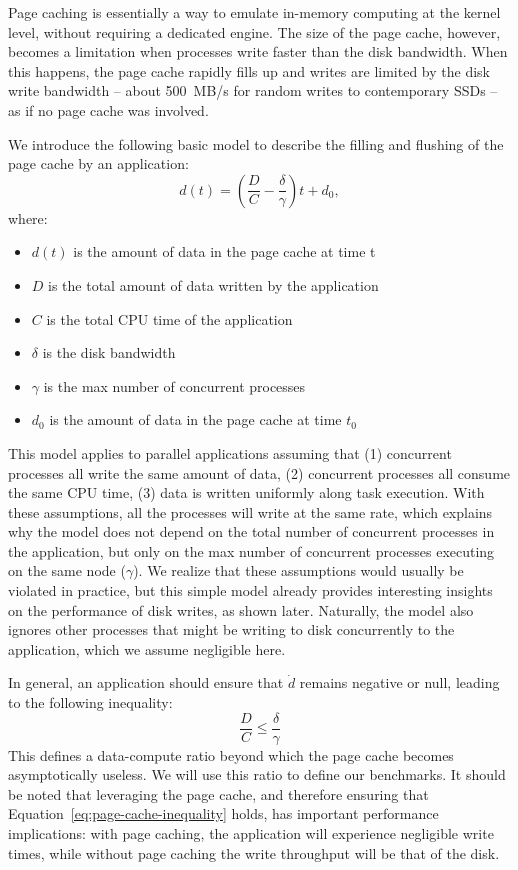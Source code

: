 \documentclass{IEEEtran}
\begin{document}
Page caching is essentially a way to 
emulate in-memory computing at the kernel level, without requiring a 
dedicated engine. The size of the page cache, however, becomes a 
limitation when processes write faster than the disk bandwidth. When 
this happens, the page cache rapidly fills up and writes are limited by 
the disk write bandwidth -- about 500~MB/s for random writes to 
contemporary SSDs  -- as if no page cache was involved.

We introduce the following basic model to describe the filling and 
flushing of the page cache by an application:
$$
d(t) = \left( \frac{D}{C} - \frac{\delta}{\gamma} \right)t + d_0,
$$
where:
\begin{itemize}
\item $d(t)$ is the amount of data in the page cache at time t
\item $D$ is the total amount of data written by the application
\item $C$ is the total CPU time of the application
\item $\delta$ is the disk bandwidth
\item $\gamma$ is the max number of concurrent processes
\item $d_0$ is the amount of data in the page cache at time $t_0$
\end{itemize}

This model applies to parallel applications assuming that (1) 
concurrent processes all write the same amount of data, (2) 
concurrent processes all consume the same CPU time, (3) data is written 
uniformly along task execution. With these assumptions, all the 
processes will write at the same rate, which explains why the model 
does not depend on the total number of concurrent processes in the 
application, but only on the max number of concurrent processes 
executing on the same node ($\gamma$). We realize that these 
assumptions would usually be violated in practice, but this simple 
model already provides interesting insights on the performance of disk 
writes, as shown later. Naturally, the model also ignores other 
processes that might be writing to disk concurrently to the 
application, which we assume negligible here. 

In general, an application should ensure that $\dot d$ remains negative 
or null, leading to the following inequality:
\begin{equation}
\frac{D}{C} \leq \frac{\delta}{\gamma} \label{eq:page-cache-inequality}
\end{equation}
This defines a data-compute ratio beyond which the page cache becomes 
asymptotically useless. We will use this ratio to define our benchmarks. It 
should be noted that leveraging the page cache, and therefore ensuring 
that Equation~\ref{eq:page-cache-inequality} holds, has important 
performance implications: with page caching, the application will 
experience negligible write times, while without page caching 
the write throughput will be that of the disk.
\end{document}
